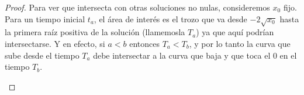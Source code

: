 \begin{proof}
Para ver que intersecta con otras soluciones no nulas, consideremos
\(x_0\) fijo. Para un tiempo inicial \(t_a\), el área de interés es el trozo que va
desde \(-2\sqrt{x_0}\) hasta la primera raíz positiva de la solución (llamemosla
\(T_a\)) ya que aquí podrían intersectarse. Y en efecto, si \(a < b\) entonces
\(T_a < T_b\), y por lo tanto la curva que sube desde el tiempo \(T_a\) debe
intersectar a la curva que baja y que toca el \(0\) en el tiempo \(T_b\).
\begin{center}
\end{center}
\end{proof}

